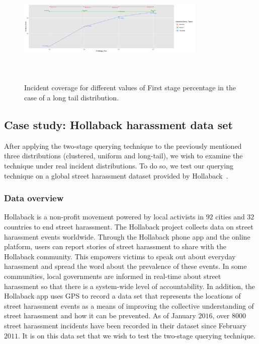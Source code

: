 \documentclass{acm_proc_article-sp}
\begin{document}
\begin{figure}[!h]
\centering
\includegraphics[width=9cm ,height=5.5cm]{figuresPng/LT-incidCov.png}
\caption{Incident coverage for different values of First stage percentage in the case of a long tail distribution. }
\label{fig:LTIncdCove}
\end{figure}
\subsection{Case study: Hollaback harassment data set}
After applying the two-stage querying technique to the previously mentioned three distributions (clustered, uniform and long-tail), we wish to examine the technique under real incident distributions. To do so, we test our querying technique on a global street harassment dataset provided by Hollaback~\cite{hollaback}.
\subsubsection{Data overview}
Hollaback is a non-profit movement powered by local activists in $92$ cities and $32$ countries to end street harassment. The Hollaback project collects data on street harassment events worldwide. Through the Hollaback phone app and the online platform, users can report stories of street harassment to share with the Hollaback community. This empowers victims to speak out about everyday harassment and spread the word about the prevalence of these events. In some communities, local governments are informed in real-time about street harassment so that there is a system-wide level of accountability. In addition, the Hollaback app uses GPS to record a data set that represents the locations of street harassment events as a means of improving the collective understanding of street harassment and how it can be prevented.  As of January $2016$, over $8000$ street harassment incidents have been recorded in their dataset since February $2011$.  It is on this data set that we wish to test the two-stage querying technique.\par
\end{document}
